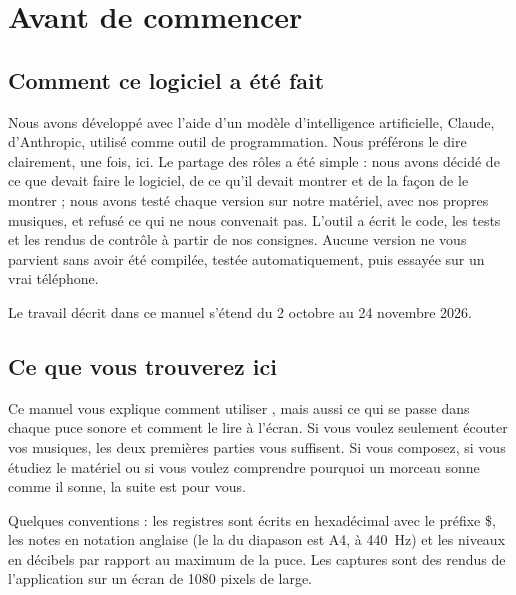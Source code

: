 \chapter*{Avant de commencer}

\section*{Comment ce logiciel a été fait}
Nous avons développé \soft avec l'aide d'un modèle d'intelligence artificielle, Claude, d'Anthropic, utilisé comme
outil de programmation. Nous préférons le dire clairement, une fois, ici. Le partage des rôles a été simple : nous
avons décidé de ce que devait faire le logiciel, de ce qu'il devait montrer et de la façon de le montrer ; nous
avons testé chaque version sur notre matériel, avec nos propres musiques, et refusé ce qui ne nous convenait pas.
L'outil a écrit le code, les tests et les rendus de contrôle à partir de nos consignes. Aucune version ne vous
parvient sans avoir été compilée, testée automatiquement, puis essayée sur un vrai téléphone.

Le travail décrit dans ce manuel s'étend du 2 octobre au 24 novembre 2026.

\section*{Ce que vous trouverez ici}
Ce manuel vous explique comment utiliser \soft, mais aussi ce qui se passe dans chaque puce sonore et comment le
lire à l'écran. Si vous voulez seulement écouter vos musiques, les deux premières parties vous suffisent. Si vous
composez, si vous étudiez le matériel ou si vous voulez comprendre pourquoi un morceau sonne comme il sonne, la
suite est pour vous.

Quelques conventions : les registres sont écrits en hexadécimal avec le préfixe \$, les notes en notation anglaise
(le la du diapason est A4, à 440~Hz) et les niveaux en décibels par rapport au maximum de la puce. Les captures
sont des rendus de l'application sur un écran de 1080 pixels de large.
